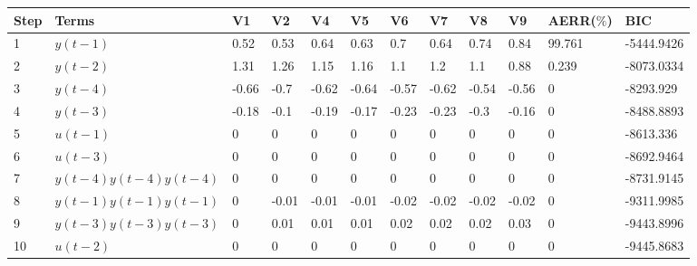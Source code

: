 \begin{tabular}{llllllllllll}
Step & Terms & V1 & V2 & V4 & V5 & V6 & V7 & V8 & V9 & AERR($\%$) & BIC \\ 
\hline 
1 & $y(t-1)$ & 0.52 & 0.53 & 0.64 & 0.63 & 0.7 & 0.64 & 0.74 & 0.84 & 99.761 & -5444.9426 \\ 
2 & $y(t-2)$ & 1.31 & 1.26 & 1.15 & 1.16 & 1.1 & 1.2 & 1.1 & 0.88 & 0.239 & -8073.0334 \\ 
3 & $y(t-4)$ & -0.66 & -0.7 & -0.62 & -0.64 & -0.57 & -0.62 & -0.54 & -0.56 & 0 & -8293.929 \\ 
4 & $y(t-3)$ & -0.18 & -0.1 & -0.19 & -0.17 & -0.23 & -0.23 & -0.3 & -0.16 & 0 & -8488.8893 \\ 
5 & $u(t-1)$ & 0 & 0 & 0 & 0 & 0 & 0 & 0 & 0 & 0 & -8613.336 \\ 
6 & $u(t-3)$ & 0 & 0 & 0 & 0 & 0 & 0 & 0 & 0 & 0 & -8692.9464 \\ 
7 & $y(t-4)y(t-4)y(t-4)$ & 0 & 0 & 0 & 0 & 0 & 0 & 0 & 0 & 0 & -8731.9145 \\ 
8 & $y(t-1)y(t-1)y(t-1)$ & 0 & -0.01 & -0.01 & -0.01 & -0.02 & -0.02 & -0.02 & -0.02 & 0 & -9311.9985 \\ 
9 & $y(t-3)y(t-3)y(t-3)$ & 0 & 0.01 & 0.01 & 0.01 & 0.02 & 0.02 & 0.02 & 0.03 & 0 & -9443.8996 \\ 
10 & $u(t-2)$ & 0 & 0 & 0 & 0 & 0 & 0 & 0 & 0 & 0 & -9445.8683 \\ 
\hline 
\end{tabular}